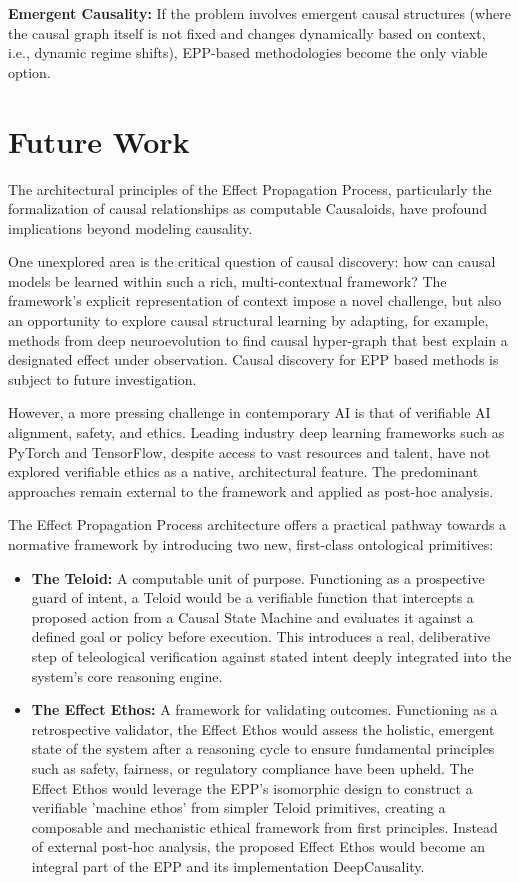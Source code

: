 \documentclass{article}
\begin{document}
\textbf{Emergent Causality:} If the problem involves emergent causal structures (where the causal graph itself is not fixed and changes dynamically based on context, i.e., dynamic regime shifts), EPP-based methodologies become the only viable option.


\newpage

\section{Future Work}
\label{sec:future_work}

The architectural principles of the Effect Propagation Process, particularly the formalization of causal relationships
as computable Causaloids, have profound implications beyond modeling causality.


One unexplored area is the critical question of causal discovery: how can causal models be learned within such a rich,
multi-contextual framework? The framework's explicit representation of context impose a novel challenge, but also
an opportunity to explore causal structural learning by adapting, for example, methods from deep neuroevolution to find
causal hyper-graph that best explain a designated effect under observation. Causal discovery for EPP based methods
is subject to future investigation.

However, a more pressing challenge in contemporary AI is that of verifiable AI alignment, safety, and ethics. Leading
industry deep learning frameworks such as PyTorch and TensorFlow, despite access to vast resources and talent, have not
explored verifiable ethics as a native, architectural feature. The predominant approaches remain external to the
framework and applied as post-hoc analysis.

The Effect Propagation Process architecture offers a practical pathway towards a normative framework by introducing two
new, first-class ontological primitives:

\begin{itemize}
    \item \textbf{The Teloid:} A computable unit of purpose. Functioning as a prospective guard of intent, a Teloid would be a
  verifiable function that intercepts a proposed action from a Causal State Machine and evaluates it against a defined
  goal or policy before execution. This introduces a real, deliberative step of teleological verification against stated
  intent deeply integrated into the system's core reasoning engine.
    \item \textbf{The Effect Ethos:}  A framework for validating outcomes. Functioning as a retrospective validator, the Effect Ethos
  would assess the holistic, emergent state of the system after a reasoning cycle to ensure fundamental principles such
  as safety, fairness, or regulatory compliance have been upheld. The Effect Ethos would leverage the EPP's isomorphic
  design to construct a verifiable 'machine ethos' from simpler Teloid primitives, creating a composable and mechanistic
  ethical framework from first principles. Instead of external post-hoc analysis, the proposed Effect Ethos would become
  an integral part of the EPP and its implementation DeepCausality.
\end{itemize}
\end{document}
